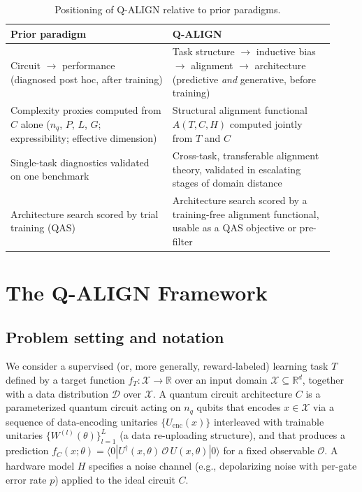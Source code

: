 \documentclass[11pt]{article}
\newcommand{\R}{\mathbb{R}}
\begin{document}
\begin{table}[htbp]
\centering
\caption{Positioning of Q-ALIGN relative to prior paradigms.}
\label{tab:positioning}
\begin{tabular}{@{}p{0.46\linewidth}p{0.46\linewidth}@{}}
\toprule
\textbf{Prior paradigm} & \textbf{Q-ALIGN} \\
\midrule
Circuit $\rightarrow$ performance (diagnosed post hoc, after training) & Task structure $\rightarrow$ inductive bias $\rightarrow$ alignment $\rightarrow$ architecture (predictive \emph{and} generative, before training) \\
\addlinespace
Complexity proxies computed from $C$ alone ($n_q$, $P$, $L$, $G$; expressibility; effective dimension) & Structural alignment functional $A(T,C,H)$ computed jointly from $T$ and $C$ \\
\addlinespace
Single-task diagnostics validated on one benchmark & Cross-task, transferable alignment theory, validated in escalating stages of domain distance \\
\addlinespace
Architecture search scored by trial training (QAS) & Architecture search scored by a training-free alignment functional, usable as a QAS objective or pre-filter \\
\bottomrule
\end{tabular}
\end{table}

\section{The Q-ALIGN Framework}
\label{sec:theory}

\subsection{Problem setting and notation}
We consider a supervised (or, more generally, reward-labeled) learning task $T$ defined by a target function $f_T : \mathcal{X} \to \R$ over an input domain $\mathcal{X} \subseteq \R^d$, together with a data distribution $\mathcal{D}$ over $\mathcal{X}$. A quantum circuit architecture $C$ is a parameterized quantum circuit acting on $n_q$ qubits that encodes $x \in \mathcal{X}$ via a sequence of data-encoding unitaries $\{U_{\mathrm{enc}}(x)\}$ interleaved with trainable unitaries $\{W^{(l)}(\theta)\}_{l=1}^{L}$ (a data re-uploading structure), and that produces a prediction $f_C(x;\theta) = \langle 0 | U^\dagger(x,\theta)\, \mathcal{O} \,U(x,\theta) | 0 \rangle$ for a fixed observable $\mathcal{O}$. A hardware model $H$ specifies a noise channel (e.g., depolarizing noise with per-gate error rate $p$) applied to the ideal circuit $C$.
\end{document}
